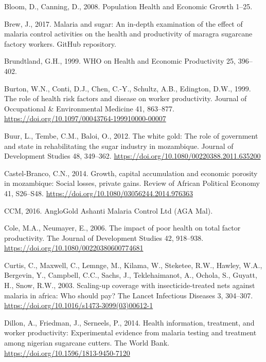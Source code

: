 \documentclass[]{article}
\begin{document}
\hypertarget{ref-Bloom2008}{}
Bloom, D., Canning, D., 2008. Population Health and Economic Growth
1--25.

\hypertarget{ref-brewgit}{}
Brew, J., 2017. Malaria and sugar: An in-depth examination of the effect
of malaria control activities on the health and productivity of maragra
sugarcane factory workers. GitHub repository.

\hypertarget{ref-World1999}{}
Brundtland, G.H., 1999. WHO on Health and Economic Productivity 25,
396--402.

\hypertarget{ref-Burton1999}{}
Burton, W.N., Conti, D.J., Chen, C.-Y., Schultz, A.B., Edington, D.W.,
1999. The role of health risk factors and disease on worker
productivity. Journal of Occupational \& Environmental Medicine 41,
863--877. \url{https://doi.org/10.1097/00043764-199910000-00007}

\hypertarget{ref-Buur2012}{}
Buur, L., Tembe, C.M., Baloi, O., 2012. The white gold: The role of
government and state in rehabilitating the sugar industry in mozambique.
Journal of Development Studies 48, 349--362.
\url{https://doi.org/10.1080/00220388.2011.635200}

\hypertarget{ref-CastelBranco2014}{}
Castel-Branco, C.N., 2014. Growth, capital accumulation and economic
porosity in mozambique: Social losses, private gains. Review of African
Political Economy 41, S26--S48.
\url{https://doi.org/10.1080/03056244.2014.976363}

\hypertarget{ref-anglo}{}
CCM, 2016. AngloGold Ashanti Malaria Control Ltd (AGA Mal).

\hypertarget{ref-Cole2006}{}
Cole, M.A., Neumayer, E., 2006. The impact of poor health on total
factor productivity. The Journal of Development Studies 42, 918--938.
\url{https://doi.org/10.1080/00220380600774681}

\hypertarget{ref-Curtis2003}{}
Curtis, C., Maxwell, C., Lemnge, M., Kilama, W., Steketee, R.W., Hawley,
W.A., Bergevin, Y., Campbell, C.C., Sachs, J., Teklehaimanot, A.,
Ochola, S., Guyatt, H., Snow, R.W., 2003. Scaling-up coverage with
insecticide-treated nets against malaria in africa: Who should pay? The
Lancet Infectious Diseases 3, 304--307.
\url{https://doi.org/10.1016/s1473-3099(03)00612-1}

\hypertarget{ref-Dillon2014}{}
Dillon, A., Friedman, J., Serneels, P., 2014. Health information,
treatment, and worker productivity: Experimental evidence from malaria
testing and treatment among nigerian sugarcane cutters. The World Bank.
\url{https://doi.org/10.1596/1813-9450-7120}
\end{document}
